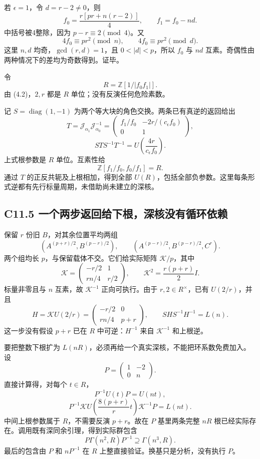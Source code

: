 {若} \(\epsilon=1\){，令} \(d=r-2\ne0\){，则} \[
f_0=\frac{r[pr+n(r-2)]}{4},\qquad f_1=f_0-nd.
\] {中括号被4整除，因为} \(p-r\equiv2\pmod4\){。又} \[
4f_0\equiv pr^2\pmod n,\qquad
4f_0\equiv pr^2\pmod d.
\] {这里} \(n,d\) {均奇，}\(\gcd(r,d)=1\){，且} \(0<|d|<p\){，所以} \(f_0\) {与} \(nd\) {互素。奇偶性由两种情况下的差均为奇数得到。证毕。}

{令} \[
R=\mathbb Z[1/|f_0f_1|].
\tag{C11.4.3}
\] {由} {(4.2)，}\(2,r\) {都是} \(R\) {单位；没有反演任何危险素数。}

{记} \(S=\operatorname{diag}(1,-1)\) {为两个等大块的角色交换。两条已有真逆的返回给出} \[
T=\mathcal J_{\alpha_1}\mathcal J_{\alpha_0}^{-1}
=\begin{pmatrix}
f_1/f_0&-2r/(c_\epsilon f_0)\\0&1
\end{pmatrix},
\] \[
\boxed{STS^{-1}T^{-1}=U\!\left(\frac{4r}{c_\epsilon f_0}\right).}
\tag{C11.4.4}
\] {上式根参数是} \(R\) {单位。互素性给} \[
\mathbb Z[f_1/f_0,f_0/f_1]=R.
\] {通过} \(T\) {的正反共轭及上根相加，得到全部} \(U(R)\){，包括全部负参数。这里每条形式逆都有先行标量周期，未借助尚未建立的深核。}

\subsection*{\texorpdfstring{{C11.5} {一个两步返回给下根，深核没有循环依赖}}{C11.5 一个两步返回给下根，深核没有循环依赖}}\label{C11-h82}

{保留} \(r\) {份旧} \(B\){，对其余位置平均两组} \[
\left(A^{(p+r)/2},B^{(p-r)/2}\right),\qquad
\left(A^{(p-r)/2},B^{(p-r)/2},C^r\right).
\tag{C11.5.1}
\] {两个组均长} \(p\){，与保留载体不交。它们给实际矩阵} \(\mathcal K/p\){，其中} \[
\mathcal K=
\begin{pmatrix}-r/2&1\\rn/4&r/2\end{pmatrix},
\qquad
\mathcal K^2=\frac{r(p+r)}2 I.
\tag{C11.5.2}
\] {标量非零且与} \(n\) {互素，故} \(\mathcal K^{-1}\) {正向可执行。由于} \(r,2\in R^\times\){，已有} \(U(2/r)\){，并且} \[
H=\mathcal K U(2/r)
=\begin{pmatrix}-r/2&0\\rn/4&p+r\end{pmatrix},
\qquad
\boxed{SHS^{-1}H^{-1}=L(n).}
\tag{C11.5.3}
\] {这一步没有假设} \(p+r\) {已在} \(R\) {中可逆：}\(H^{-1}\) {来自} \(\mathcal K^{-1}\) {和上根逆。}

{要把整数下根扩为} \(L(nR)\){，必须再给一个真实深核，不能把环系数免费加入。设} \[
P=\begin{pmatrix}1&-2\\0&n\end{pmatrix}.
\] {直接计算得，对每个} \(t\in R\){，} \[
P^{-1}U(t)P=U(nt),
\] \[
P^{-1}\mathcal K
U\!\left(\frac{8(p+r)}r t\right)
\mathcal K^{-1}P=L(nt).
\tag{C11.5.4}
\] {中间上根参数属于} \(R\){，不需要反演} \(p+r\){。故在} \(P\) {基里两条完整} \(nR\) {根已经实际存在。调用既有深同余引理，得到实际群包含} \[
P\Gamma(n^2,R)P^{-1}\supseteq\Gamma(n^3,R).
\tag{C11.5.5}
\] {最后的包含由} \(P\) {和} \(nP^{-1}\) {在} \(R\) {上整直接验证。换基只是分析，没有执行} \(P\){。}

